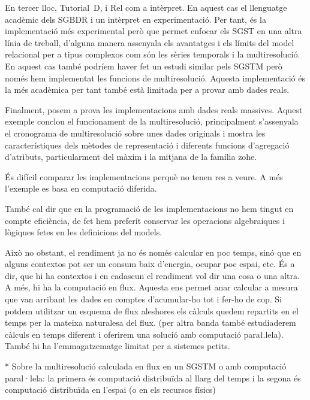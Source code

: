 En tercer lloc, Tutorial~D, i Rel com a intèrpret. En aquest cas el
llenguatge acadèmic dels \gls{SGBDR} i un intèrpret en
experimentació. Per tant, és la implementació més experimental però
que permet enfocar els \gls{SGST} en una altra línia de treball,
d'alguna manera assenyala els avantatges i els límits del model
relacional per a tipus complexos com són les sèries temporals i la
multiresolució. En aquest cas també podríem haver fet un estudi
similar pels \gls{SGSTM} però només hem implementat les funcions de
multiresolució. Aquesta implementació és la més acadèmica per tant
també està limitada per a provar amb dades reals.




Finalment, posem a prova les implementacions amb dades reals massives.
Aquest exemple conclou el funcionament de la multiresolució,
principalment s'assenyala el cronograma de multiresolució sobre unes
dades originals i mostra les característiques dels mètodes de
representació i diferents funcions d'agregació d'atributs,
particularment del màxim i la mitjana de la família \gls{zohe}.


És difícil comparar les implementacions perquè no tenen res a veure. A més l'exemple es basa en computació diferida. 

També cal dir que en la programació de les implementacions no hem tingut en compte eficiència, de fet hem preferit conservar les operacions algebraiques i lògiques fetes en les definicions del models.

Això no obstant, el rendiment ja no és només calcular en poc temps, sinó que en alguns contextos pot ser un consum baix d'energia, ocupar poc espai, etc.
És a dir, que hi ha contextos i en cadascun el rendiment vol dir una cosa o una altra.
A més, hi ha la computació en flux. Aquesta ens permet anar calcular a mesura que van arribant les dades en comptes d'acumular-ho tot i fer-ho de cop. Si potdem utilitzar un esquema de flux aleshores els càlculs quedem repartits en el temps per la mateixa naturalesa del flux. (per altra banda també estudiaderem càlculs en temps diferent i oferirem una solució amb computació para\l.lela).
També hi ha l'emmagatzematge limitat per a sistemes petits.



* Sobre la multiresolució calculada en flux en un SGSTM o amb computació paral·lela: la primera és computació distribuïda al llarg del temps i la segona és computació distribuïda en l'espai (o en els recursos físics)



